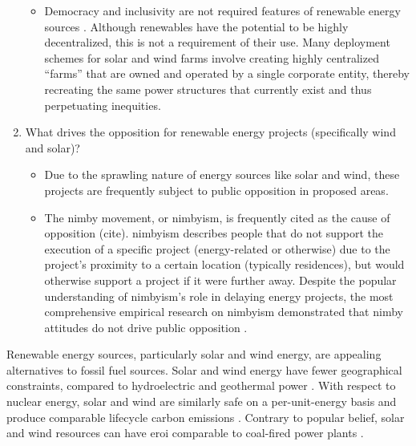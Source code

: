 \begin{enumerate}
\begin{itemize}
        \item Democracy and inclusivity are not required features of renewable
        energy sources \cite{bell_toward_2020,winner_artifacts_1980}. Although
        renewables have the potential to be highly decentralized, this is not a
        requirement of their use. Many deployment schemes for solar and wind
        farms involve creating highly centralized ``farms'' that are owned and
        operated by a single corporate entity, thereby recreating the same power
        structures that currently exist and thus perpetuating inequities.
    \end{itemize}
    \item What drives the opposition for renewable energy projects (specifically
    wind and solar)?
    \begin{itemize}
        \item Due to the sprawling nature of energy sources like solar and wind,
        these projects are frequently subject to public opposition in proposed
        areas.
        \item The \ac{nimby} movement, or \acs{nimbyism}, is frequently cited as
        the cause of opposition (cite). \ac{nimbyism} describes people that do
        not support the execution of a specific project (energy-related or
        otherwise) due to the project's proximity to a certain location
        (typically residences), but would otherwise support a project if it were
        further away. Despite the popular understanding of \ac{nimbyism}'s role
        in delaying energy projects, the most comprehensive empirical research
        on \ac{nimbyism} demonstrated that \ac{nimby} attitudes do not drive
        public opposition \cite{konisky_proximity_2021}. 
    \end{itemize}
\end{enumerate}


Renewable energy sources, particularly solar and wind energy, are appealing
alternatives to fossil fuel sources. Solar and wind energy have fewer
geographical constraints, compared to hydroelectric and geothermal power
\cite{lopez_us_2012}. With respect to nuclear energy, solar and wind are similarly safe 
on a per-unit-energy basis and produce comparable lifecycle carbon emissions
\cite{united_nations_economic_commission_for_europe_carbon_2022,sovacool_balancing_2016,
intergovernmental_panel_on_climate_change_climate_2014}. Contrary to popular belief, 
solar and wind resources can have \ac{eroi} comparable to coal-fired power plants \cite{murphy_energy_2022}.